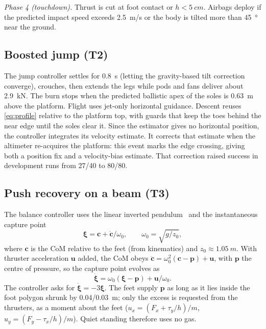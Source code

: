 \documentclass[conference]{IEEEtran}
\newcommand{\vect}[1]{\boldsymbol{#1}}
\begin{document}
\emph{Phase 4 (touchdown).} Thrust is cut at foot contact or $h<\SI{5}{cm}$. Airbags deploy if the predicted impact speed exceeds \SI{2.5}{m/s} or the body is tilted more than \SI{45}{\degree} near the ground.

\subsection{Boosted jump (T2)}
The jump controller settles for \SI{0.8}{s} (letting the gravity-based tilt correction converge), crouches, then extends the legs while pods and fans deliver about \SI{2.9}{kN}. The burn stops when the predicted ballistic apex of the soles is \SI{0.63}{m} above the platform. Flight uses jet-only horizontal guidance. Descent reuses \eqref{eq:profile} relative to the platform top, with guards that keep the toes behind the near edge until the soles clear it. Since the estimator gives no horizontal position, the controller integrates its velocity estimate. It corrects that estimate when the altimeter re-acquires the platform: this event marks the edge crossing, giving both a position fix and a velocity-bias estimate. That correction raised success in development runs from 27/40 to 80/80.

\subsection{Push recovery on a beam (T3)}
The balance controller uses the linear inverted pendulum~\cite{kajita2001lipm} and the instantaneous capture point~\cite{pratt2006capture}
\begin{equation}
\vect\xi=\vect c+\dot{\vect c}/\omega_0,\qquad \omega_0=\sqrt{g/z_0},
\label{eq:cp}
\end{equation}
where $\vect c$ is the CoM relative to the feet (from kinematics) and $z_0\approx\SI{1.05}{m}$. With thruster acceleration $\vect u$ added, the CoM obeys $\ddot{\vect c}=\omega_0^2(\vect c-\vect p)+\vect u$, with $\vect p$ the centre of pressure, so the capture point evolves as
\begin{equation}
\dot{\vect\xi}=\omega_0(\vect\xi-\vect p)+\vect u/\omega_0 .
\label{eq:cpdyn}
\end{equation}
The controller asks for $\dot{\vect\xi}=-3\vect\xi$. The feet supply $\vect p$ as long as it lies inside the foot polygon shrunk by \num{0.04}/\SI{0.03}{m}; only the excess is requested from the thrusters, as a moment about the feet ($u_x=(F_x+\tau_y/h)/m$, $u_y=(F_y-\tau_x/h)/m$). Quiet standing therefore uses no gas.
\end{document}

